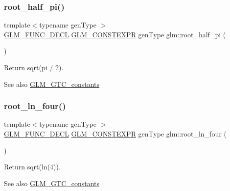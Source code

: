 \subsubsection{\texorpdfstring{root\+\_\+half\+\_\+pi()}{root\_half\_pi()}}
{\footnotesize\ttfamily template$<$typename gen\+Type $>$ \\
\mbox{\hyperlink{setup_8hpp_ab2d052de21a70539923e9bcbf6e83a51}{G\+L\+M\+\_\+\+F\+U\+N\+C\+\_\+\+D\+E\+CL}} \mbox{\hyperlink{setup_8hpp_a08b807947b47031d3a511f03f89645ad}{G\+L\+M\+\_\+\+C\+O\+N\+S\+T\+E\+X\+PR}} gen\+Type glm\+::root\+\_\+half\+\_\+pi (\begin{DoxyParamCaption}{ }\end{DoxyParamCaption})}

Return sqrt(pi / 2). \begin{DoxySeeAlso}{See also}
\mbox{\hyperlink{group__gtc__constants}{G\+L\+M\+\_\+\+G\+T\+C\+\_\+constants}} 
\end{DoxySeeAlso}
\mbox{\label{group__gtc__constants_ga4129412e96b33707a77c1a07652e23e2}} 
\subsubsection{\texorpdfstring{root\+\_\+ln\+\_\+four()}{root\_ln\_four()}}
{\footnotesize\ttfamily template$<$typename gen\+Type $>$ \\
\mbox{\hyperlink{setup_8hpp_ab2d052de21a70539923e9bcbf6e83a51}{G\+L\+M\+\_\+\+F\+U\+N\+C\+\_\+\+D\+E\+CL}} \mbox{\hyperlink{setup_8hpp_a08b807947b47031d3a511f03f89645ad}{G\+L\+M\+\_\+\+C\+O\+N\+S\+T\+E\+X\+PR}} gen\+Type glm\+::root\+\_\+ln\+\_\+four (\begin{DoxyParamCaption}{ }\end{DoxyParamCaption})}

Return sqrt(ln(4)). \begin{DoxySeeAlso}{See also}
\mbox{\hyperlink{group__gtc__constants}{G\+L\+M\+\_\+\+G\+T\+C\+\_\+constants}} 
\end{DoxySeeAlso}
\mbox{\label{group__gtc__constants_ga261380796b2cd496f68d2cf1d08b8eb9}} 
